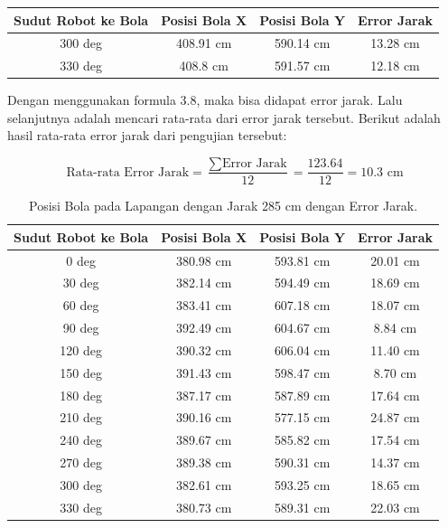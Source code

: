\begin{longtable}{|c|c|c|c|}
  \hline
  \rowcolor[HTML]{C0C0C0}
  \textbf{Sudut Robot ke Bola} & \textbf{Posisi Bola X} & \textbf{Posisi Bola Y} & \textbf{Error Jarak} \\
  \hline
  300 deg           & 408.91 cm                & 590.14 cm    & 13.28 cm       \\
  330 deg           & 408.8 cm                & 591.57 cm    & 12.18 cm       \\
  \hline
\end{longtable}

Dengan menggunakan formula 3.8, maka bisa didapat error jarak. Lalu selanjutnya adalah mencari rata-rata dari error jarak tersebut. Berikut adalah hasil rata-rata error jarak dari pengujian tersebut: 

\begin{equation}
  \text{Rata-rata Error Jarak} = \frac{\sum \text{Error Jarak}}{12} = \frac{123.64}{12} = 10.3 \text{ cm}
\end{equation}

\begin{longtable}{|c|c|c|c|}
  \caption{Posisi Bola pada Lapangan dengan Jarak 285 cm dengan Error Jarak.}
  \label{tb:posisibolalapangan285}                                   \\
  \hline
  \rowcolor[HTML]{C0C0C0}
  \textbf{Sudut Robot ke Bola} & \textbf{Posisi Bola X} & \textbf{Posisi Bola Y} & \textbf{Error Jarak} \\
  \hline
  0 deg            & 380.98 cm                & 593.81 cm    & 20.01 cm        \\
  30 deg           & 382.14 cm                & 594.49 cm    & 18.69 cm        \\
  60 deg           & 383.41 cm                & 607.18 cm    &  18.07 cm     \\
  90 deg           & 392.49 cm                & 604.67 cm    & 8.84 cm     \\
  120 deg           & 390.32 cm                & 606.04 cm   & 11.40 cm      \\
  150 deg           & 391.43 cm                & 598.47 cm   & 8.70 cm       \\
  180 deg           & 387.17 cm                & 587.89 cm   &  17.64 cm     \\
  210 deg           & 390.16 cm                & 577.15 cm   &  24.87 cm      \\
  240 deg           & 389.67 cm                & 585.82 cm   &  17.54 cm      \\
  270 deg           & 389.38 cm                & 590.31 cm   &  14.37 cm      \\
  300 deg           & 382.61 cm                & 593.25 cm   &  18.65 cm      \\
  330 deg           & 380.73 cm                & 589.31 cm    & 22.03 cm       \\
  \hline
\end{longtable}

